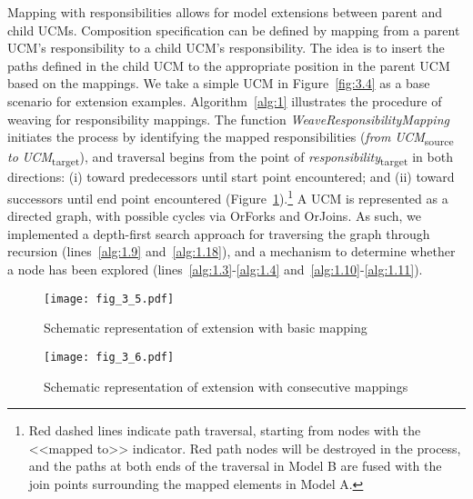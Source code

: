 Mapping with responsibilities allows for model extensions between parent and child UCMs. Composition specification can be defined by mapping from a parent UCM's responsibility to a child UCM's responsibility. The idea is to insert the paths defined in the child UCM to the appropriate position in the parent UCM based on the mappings. We take a simple UCM in Figure~\ref{fig:3.4} as a base scenario for extension examples. Algorithm~\ref{alg:1} illustrates the procedure of weaving for responsibility mappings. The function \emph{WeaveResponsibilityMapping} initiates the process by identifying the mapped responsibilities (\emph{from} \emph{UCM}\textsubscript{source} \emph{to} \emph{UCM}\textsubscript{target}), and traversal begins from the point of \emph{responsibility}\textsubscript{target} in both directions: (i) toward predecessors until start point encountered; and (ii) toward successors until end point encountered (Figure~\ref{fig:3.5}).\footnote{Red dashed lines indicate path traversal, starting from nodes with the <<mapped to>> indicator. Red path nodes will be destroyed in the process, and the paths at both ends of the traversal in Model B are fused with the join points surrounding the mapped elements in Model A.} A UCM is represented as a directed graph, with possible cycles via {\cls OrFork}s and {\cls OrJoin}s. As such, we implemented a depth-first search approach for traversing the graph through recursion (lines~\ref{alg:1.9} and~\ref{alg:1.18}), and a mechanism to determine whether a node has been explored (lines~\ref{alg:1.3}-\ref{alg:1.4} and~\ref{alg:1.10}-\ref{alg:1.11}).

\begin{figure}
	\centering
	\texttt{[image: fig\_3\_5.pdf]}
	\caption{Schematic representation of extension with basic mapping}
	\label{fig:3.5}
\end{figure}

\begin{figure}[h]
	\centering
	\texttt{[image: fig\_3\_6.pdf]}
	\caption{Schematic representation of extension with consecutive mappings}
	\label{fig:3.6}
\end{figure}

